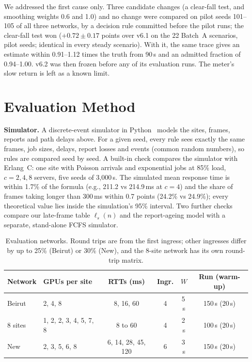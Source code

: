 \documentclass[conference]{IEEEtran}
\begin{document}
We addressed the first cause only. Three candidate changes (a clear-fall test, and smoothing weights 0.6 and 1.0) and no change were compared on pilot seeds 101--105 of all three networks, by a decision rule committed before the pilot runs; the clear-fall test won ($+0.72 \pm 0.17$ points over v6.1 on the 22 Batch~A scenarios, pilot seeds; identical in every steady scenario). With it, the same trace gives an estimate within 0.91--1.12 times the truth from 90\,s and an admitted fraction of 0.94--1.00. v6.2 was then frozen before any of its evaluation runs. The meter's slow return is left as a known limit.

\section{Evaluation Method}\label{sec:method}
\textbf{Simulator.} A discrete-event simulator in Python~\cite{repo} models the sites, frames, reports and path delays above. For a given seed, every rule sees exactly the same frames, job sizes, delays, report losses and events (common random numbers), so rules are compared seed by seed. A built-in check compares the simulator with Erlang~C: one site with Poisson arrivals and exponential jobs at 85\% load, $c = 2, 4, 8$ servers, five seeds of 3,000\,s. The simulated mean response time is within 1.7\% of the formula (e.g., 211.2 vs 214.9\,ms at $c = 4$) and the share of frames taking longer than 300\,ms within 0.7 points (24.2\% vs 24.9\%); every theoretical value lies inside the simulation's 95\% interval. Two further checks compare our late-frame table $\ell_s(n)$ and the report-ageing model with a separate, stand-alone FCFS simulator.

\begin{table}[t]
\centering
\caption{Evaluation networks. Round trips are from the first ingress; other ingresses differ by up to 25\% (Beirut) or 30\% (New), and the 8-site network has its own round-trip matrix.}
\label{tab:nets}
\footnotesize
\setlength{\tabcolsep}{2.2pt}
\begin{tabular}{@{}llcccc@{}}
\toprule
Network & GPUs per site & RTTs (ms) & Ingr. & $W$ & Run (warm-up)\\
\midrule
Beirut & 2, 4, 8 & 8, 16, 60 & 4 & 5\,s & 150\,s (20\,s)\\
8 sites & 1, 2, 2, 3, 4, 5, 7, 8 & 8 to 60 & 4 & 2\,s & 100\,s (20\,s)\\
New & 2, 3, 5, 6, 8 & 6, 14, 28, 45, 120 & 6 & 3\,s & 150\,s (20\,s)\\
\bottomrule
\end{tabular}
\end{table}
\end{document}

